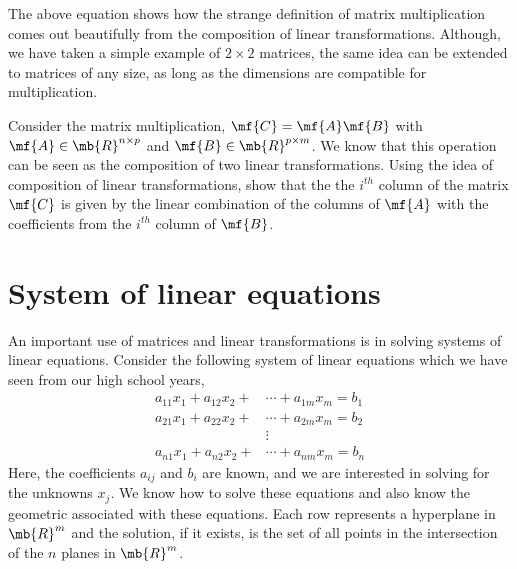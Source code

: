 The above equation shows how the strange definition of matrix multiplication comes out beautifully from the composition of linear transformations. Although, we have taken a simple example of $2 \times 2$ matrices, the same idea can be extended to matrices of any size, as long as the dimensions are compatible for multiplication.

\begin{boxedstuff}
    \begin{problem}
        Consider the matrix multiplication, $\mf{C} = \mf{A}\mf{B}$ with $\mf{A} \in \mb{R}^{n \times p}$ and $\mf{B} \in \mb{R}^{p \times m}$. We know that this operation can be seen as the composition of two linear transformations. Using the idea of composition of linear transformations, show that the the $i^{th}$ column of the matrix $\mf{C}$ is given by the linear combination of the columns of $\mf{A}$ with the coefficients from the $i^{th}$ column of $\mf{B}$.
    \end{problem}
\end{boxedstuff}

\section{System of linear equations}\label{sec:ch03-sys-lin-eqn}
An important use of matrices and linear transformations is in solving systems of linear equations. Consider the following system of linear equations which we have seen from our high school years,
\begin{equation}
    \begin{split}
        a_{11}x_1 + a_{12}x_2 + &\cdots + a_{1m}x_m = b_1\\
        a_{21}x_1 + a_{22}x_2 + &\cdots + a_{2m}x_m = b_2\\
        &\vdots\\
        a_{n1}x_1 + a_{n2}x_2 + &\cdots + a_{nm}x_m = b_n
    \end{split}
    \label{eq:ch03-sys-lin-eqn}
\end{equation}
Here, the coefficients $a_{ij}$ and $b_{i}$ are known, and we are interested in solving for the unknowns $x_{j}$. We know how to solve these equations and also know the geometric associated with these equations. Each row represents a hyperplane in $\mb{R}^m$ and the solution, if it exists, is the set of all points in the intersection of the $n$ planes in $\mb{R}^m$.

